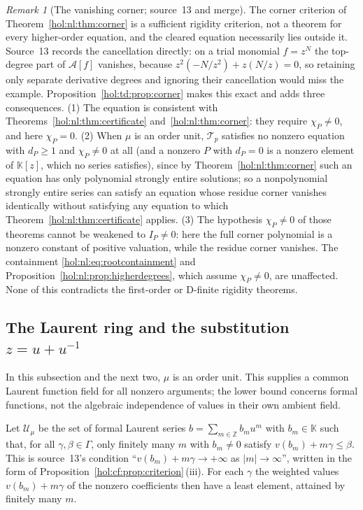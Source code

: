 \documentclass[11pt]{article}
\numberwithin{equation}{section}
\theoremstyle{definition}
\theoremstyle{remark}
\newtheorem{remark}[theorem]{Remark}
\newcommand{\Z}{\mathbb Z}
\newcommand{\abs}[1]{\lvert#1\rvert}
\newcommand{\KK}{\mathbb K}
\begin{document}
\begin{remark}[The vanishing corner; source~13 and merge]
\label{hol:td:rem:corner}
The corner criterion of Theorem~\ref{hol:nl:thm:corner} is a sufficient
rigidity criterion, not a theorem for every higher-order equation, and the
cleared equation necessarily lies outside it. Source~13 records the
cancellation directly: on a trial monomial $f=z^N$ the top-degree part of
$\mathcal A[f]$ vanishes, because $z^2(-N/z^2)+z(N/z)=0$, so retaining only
separate derivative degrees and ignoring their cancellation would miss the
example. Proposition~\ref{hol:td:prop:corner} makes this exact and adds three
consequences. (1) The equation is consistent with
Theorems~\ref{hol:nl:thm:certificate} and~\ref{hol:nl:thm:corner}: they require
$\chi_P\ne0$, and here $\chi_P=0$. (2) When $\mu$ is an order unit,
$\mathcal T_p$ satisfies no nonzero equation with $d_P\ge1$ and
$\chi_P\ne0$ at all (and a nonzero $P$ with $d_P=0$ is a nonzero element of
$\KK[z]$, which no series satisfies), since by Theorem~\ref{hol:nl:thm:corner}
such an equation has only polynomial strongly entire solutions; so a nonpolynomial strongly entire series can satisfy an
equation whose residue corner vanishes identically without satisfying any
equation to which Theorem~\ref{hol:nl:thm:certificate} applies. (3) The
hypothesis $\chi_P\ne0$ of those theorems cannot be weakened to $I_P\ne0$:
here the full corner polynomial is a nonzero constant of positive valuation,
while the residue corner vanishes. The containment
\eqref{hol:nl:eq:rootcontainment} and
Proposition~\ref{hol:nl:prop:higherdegrees}, which assume $\chi_P\ne0$, are
unaffected. None of this contradicts the first-order or D-finite rigidity
theorems.
\end{remark}

\subsection{The Laurent ring and the substitution
\texorpdfstring{$z=u+u^{-1}$}{z = u + 1/u}}\label{hol:td:sub:laurent}

In this subsection and the next two, $\mu$ is an order unit. This supplies a
common Laurent function field for all nonzero arguments; the lower bound
concerns formal functions, not the algebraic independence of values in their
own ambient field.

Let $\mathcal U_\mu$ be the set of formal Laurent series
$b=\sum_{m\in\Z}b_mu^m$ with $b_m\in\KK$ such that, for all
$\gamma,\beta\in\Gamma$, only finitely many $m$ with $b_m\ne0$ satisfy
$v(b_m)+m\gamma\le\beta$. This is source~13's condition
``$v(b_m)+m\gamma\to+\infty$ as $\abs m\to\infty$'', written in the form of
Proposition~\ref{hol:cf:prop:criterion}\,(iii). For each $\gamma$ the weighted
values $v(b_m)+m\gamma$ of the nonzero coefficients then have a least element,
attained by finitely many $m$.
\end{document}
